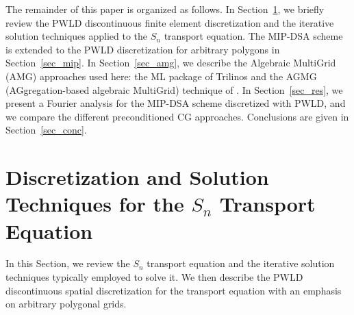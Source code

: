\documentclass[preprint,10pt]{elsarticle}
\renewcommand{\(}{\left(}
\renewcommand{\)}{\right)}
\renewcommand{\[}{\left[}
\renewcommand{\]}{\right]}
\newcommand{\sn}{\ensuremath{S_n}\xspace}
\begin{document}
The remainder of this paper is organized as follows. In Section~\ref {sec_transport},
we briefly review the PWLD discontinuous finite element discretization 
and the iterative solution techniques applied to the 
\sn transport equation. 
The MIP-DSA scheme is extended to the PWLD discretization for arbitrary 
polygons in Section~\ref {sec_mip}. In Section~\ref {sec_amg}, we describe the Algebraic MultiGrid (AMG) 
approaches used here: the ML package of Trilinos \cite{ml_guide} and the
AGMG (AGgregation-based algebraic MultiGrid) technique of 
\cite{agmg_guide,agmg,agmg2,agmg3}. In
Section~\ref {sec_res}, we present a Fourier analysis for the MIP-DSA scheme discretized with
PWLD, and we compare the different preconditioned CG approaches.
Conclusions are given in Section~\ref {sec_conc}.

\section{Discretization and Solution Techniques for the $S_n$ Transport Equation}\label{sec_transport}

In this Section, we review the \sn transport equation 
and the iterative solution techniques typically
employed to solve it. 
We then describe the PWLD discontinuous spatial
discretization for the transport equation with an emphasis on arbitrary
polygonal grids.

\end{document}
